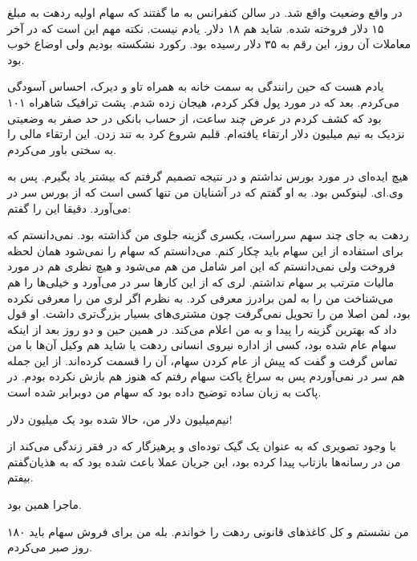 در واقع وضعیت \textbf{} واقع شد. در سالن کنفرانس به ما گفتند که سهام
اولیه ردهت به مبلغ ۱۵ دلار فروخته شده. شاید هم ۱۸ دلار. یادم
نیست. نکته مهم این است که در آخر معاملات آن روز، این رقم به ۳۵ دلار
رسیده بود. رکورد نشکسته بودیم ولی اوضاع خوب بود.

یادم هست که حین رانندگی به سمت خانه به همراه تاو و دیرک، احساس آسودگی
می‌کردم. بعد که در مورد پول فکر کردم، هیجان زده شدم. پشت ترافیک شاهراه
۱۰۱ بود که کشف کردم در عرض چند ساعت،‌ از حساب بانکی در حد صفر به وضعیتی
نزدیک به نیم میلیون دلار ارتقاء یافته‌ام. قلبم شروع کرد به تند زدن. این
ارتقاء مالی را به سختی باور می‌کردم.

هیچ ایده‌ای در مورد بورس نداشتم و در نتیجه تصمیم گرفتم که بیشتر یاد
بگیرم. پس به وی.ای. لینوکس بود. به او گفتم که در آشنایان من تنها کسی است که از بورس سر
در می‌آورد. دقیقا این را گفتم: 

ردهت به جای چند سهم سرراست، یکسری گزینه جلوی من گذاشته بود. نمی‌دانستم
که برای استفاده از این سهام باید چکار کنم. می‌دانستم که سهام را نمی‌شود
همان لحظه فروخت ولی نمی‌دانستم که این امر شامل من هم می‌شود و هیچ نظری
هم در مورد مالیات مترتب بر سهام نداشتم. لری که از این کارها سر در
می‌آورد و خیلی‌ها را هم می‌شناخت من را به لمن برادرز معرفی کرد. به نظرم اگر لری من را معرفی نکرده بود، لمن اصلا
من را تحویل نمی‌گرفت چون مشتری‌های بسیار بزرگ‌تری داشت. او قول داد که
بهترین گزینه را پیدا و به من اعلام می‌کند. در همین حین و دو روز بعد از
اینکه سهام عام شده بود، کسی از اداره نیروی انسانی ردهت یا شاید هم وکیل
آن‌ها با من تماس گرفت و گفت که پیش از عام کردن سهام، آن را قسمت
کرده‌اند. از این جمله هم سر در نمی‌آوردم پس به سراغ پاکت سهام رفتم که
هنوز هم بازش نکرده بودم. در پاکت به زبان ساده توضیح داده بود که سهام
من دوبرابر شده است.

نیم‌میلیون دلار من، حالا شده بود یک میلیون دلار!

با وجود تصویری که به عنوان یک گیک توده‌ای و پرهیزگار که در فقر زندگی
می‌کند از من در رسانه‌ها بازتاب پیدا کرده بود، این جریان عملا باعث شده
بود که به هذیان‌گفتم بیفتم.

ماجرا همین بود. 

من نشستم و کل کاغذهای قانونی ردهت را خواندم. بله من برای فروش سهام
باید ۱۸۰ روز صبر می‌کردم.


